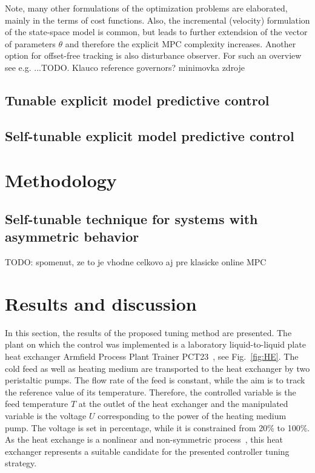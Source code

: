 \documentclass[preprint,12pt]{elsarticle}
\begin{document}
Note, many other formulations of the optimization problems are elaborated, mainly in the terms of cost functions. Also, the incremental (velocity) formulation of the state-space model is common, but leads to further extendsion of the vector of parameters $\theta$ and therefore the explicit MPC complexity increases. Another option for offset-free tracking is also disturbance observer. For such an overview see e.g. ...TODO. 
Klauco reference governors? minimovka zdroje



      

\subsection{Tunable explicit model predictive control}
\label{sec:tunable}

\subsection{Self-tunable explicit model predictive control}
\label{sec:self_tunable}


\section{Methodology}
\label{sec:methodology}

\subsection{Self-tunable technique for systems with asymmetric behavior}
\label{sec:self_tunable_new}

TODO: spomenut, ze to je vhodne celkovo aj pre klasicke online MPC

\section{Results and discussion}
\label{sec:results}

In this section, the results of the proposed tuning method are presented. The plant on which the control was implemented is a laboratory liquid-to-liquid plate heat exchanger Armfield Process Plant Trainer PCT23~\cite{pct23}, see Fig.~\ref{fig:HE}. The cold feed as well as heating medium are transported to the heat exchanger by two peristaltic pumps. The flow rate of the feed is constant, while the aim is to track the reference value of its temperature. Therefore, the controlled variable is the feed temperature $T$ at the outlet of the heat exchanger and the manipulated variable is the voltage $U$ corresponding to the power of the heating medium pump. The voltage is set in percentage, while it is constrained from 20\% to 100\%. As the heat exchange is a nonlinear and non-symmetric process~\cite{Liptak}, this heat exchanger represents a suitable candidate for the presented controller tuning strategy.  
\end{document}
